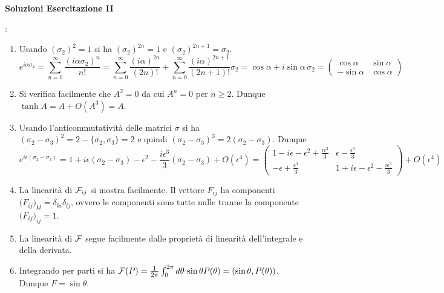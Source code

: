 \documentclass[a4paper,10pt]{article}
\begin{document}
\centerline{\LARGE\bf  Soluzioni Esercitazione II}:
\begin{enumerate}
\item Usando $(\sigma_2)^2 = 1$ si ha $(\sigma_2)^{2n}=1$ e
$(\sigma_2)^{2n+1}=\sigma_2$.
\begin{equation}\nonumber
e^{i\alpha\sigma_2} = \sum_{n=0}^\infty \frac{(i\alpha \sigma_2)^n}{n!} =
\sum_{n=0}^\infty \frac{(i\alpha)^{2n}}{(2n)!} +
\sum_{n=0}^\infty \frac{(i\alpha)^{2n+1}}{(2n+1)!} \sigma_2 
 = \cos \alpha
+ i \sin \alpha \, \sigma_2 = \begin{pmatrix} \cos \alpha & \sin \alpha \\ -\sin \alpha & 
\cos\alpha \end{pmatrix}
\end{equation} 
\item Si verifica facilmente che $A^2 = 0$ da cui $A^n = 0$ per $n\geq 2$. Dunque
$\tanh A = A + O(A^3) = A$.
\item Usando l'anticommutativit\`a delle matrici $\sigma$ si ha
$(\sigma_2 - \sigma_3)^2 = 2 - \{\sigma_2,\sigma_3\} = 2$ 
e quindi $(\sigma_2 - \sigma_3)^3=2(\sigma_2 - \sigma_3)$. Dunque
\begin{equation}\nonumber
e^{i\epsilon(\sigma_2-\sigma_3)}=1+i\epsilon(\sigma_2-\sigma_3)-\epsilon^2
-\frac{i\epsilon^3}{3}
(\sigma_2-\sigma_3) + O(\epsilon^4) = \begin{pmatrix} 1-i\epsilon-\epsilon^2 + \frac{i\epsilon^3}{3} & 
\epsilon- \frac{\epsilon^3}{3} \\
-\epsilon+ \frac{\epsilon^3}{3} &  1+i\epsilon-\epsilon^2 - \frac{i\epsilon^3}{3}
\end{pmatrix} + O(\epsilon^4)
\end{equation}
\item La linearit\`a di ${\cal F}_{ij}$ si mostra facilmente.
Il vettore $F_{ij}$ ha componenti $\big(F_{ij}\big)_{kl}=\delta_{ki}\delta_{lj}$, 
ovvero le componenti sono tutte
nulle tranne la componente $\big(F_{ij}\big)_{ij}=1$.
\item La linearit\`a di ${\cal F}$ segue facilmente dalle propriet\`a di linearit\`a dell'integrale
e della derivata.
\item Integrando per parti si ha ${\cal F}(P)=\frac1{2\pi}\int_0^{2\pi} d\theta \, \sin \theta P(\theta)=
(\sin\theta,P(\theta))$. Dunque $F=\sin \theta$.
\end{enumerate}






\newpage
\end{document}

